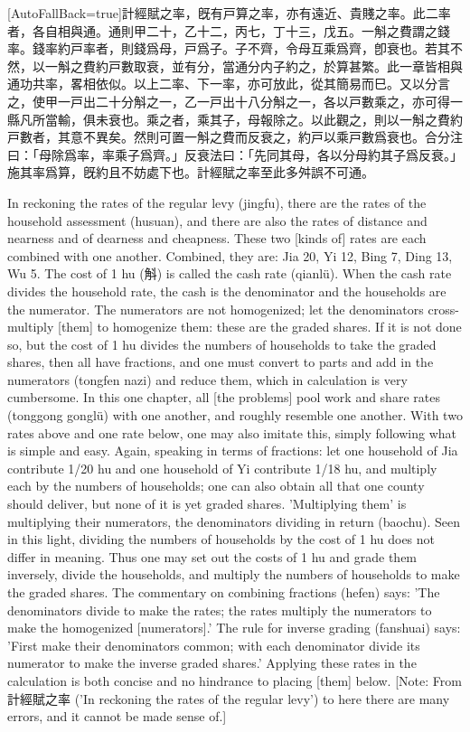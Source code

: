 \documentclass[11pt]{article}
\newcommand{\zhsmall}{\footnotesize\color{black!70}}
\newcommand{\unitlabel}[1]{\marginpar{\raggedleft\tiny\color{gray}#1}}
\newenvironment{unitzh}{\par\CJKfontspec{Noto Serif CJK SC}[AutoFallBack=true]\large\linespread{1.25}\selectfont}{\par}
\newenvironment{uniten}{\par\small\color{black!85}}{\par\medskip}
\begin{document}
\begin{unitzh}\unitlabel{jiuzhang-028.18}計經賦之率，旣有戸算之率，亦有遠近、貴賤之率。此二率者，各自相與通。通則甲二十，乙十二，丙七，丁十三，戊五。一斛之費謂之錢率。錢率約戸率者，則錢爲母，戸爲子。子不齊，令母互乘爲齊，卽衰也。若其不然，以一斛之費約戸數取衰，並有分，當通分内子約之，於算甚繁。此一章皆相與通功共率，畧相依似。以上二率、下一率，亦可放此，從其簡易而巳。又以分言之，使甲一戸出二十分斛之一，乙一戸出十八分斛之一，各以戸數乘之，亦可得一縣凡所當輸，俱未衰也。乘之者，乘其子，母報除之。以此觀之，則以一斛之費約戸數者，其意不異矣。然則可置一斛之費而反衰之，約戸以乘戸數爲衰也。合分注曰：「母除爲率，率乘子爲齊。」反衰法曰：「先同其母，各以分母約其子爲反衰。」施其率爲算，旣約且不妨處下也。{\zhsmall 計經賦之率至此多舛誤不可通。}\end{unitzh}
\begin{uniten}In reckoning the rates of the regular levy (jingfu), there are the rates of the household assessment (husuan), and there are also the rates of distance and nearness and of dearness and cheapness. These two [kinds of] rates are each combined with one another. Combined, they are: Jia 20, Yi 12, Bing 7, Ding 13, Wu 5. The cost of 1 hu (斛) is called the cash rate (qianlü). When the cash rate divides the household rate, the cash is the denominator and the households are the numerator. The numerators are not homogenized; let the denominators cross-multiply [them] to homogenize them: these are the graded shares. If it is not done so, but the cost of 1 hu divides the numbers of households to take the graded shares, then all have fractions, and one must convert to parts and add in the numerators (tongfen nazi) and reduce them, which in calculation is very cumbersome. In this one chapter, all [the problems] pool work and share rates (tonggong gonglü) with one another, and roughly resemble one another. With two rates above and one rate below, one may also imitate this, simply following what is simple and easy. Again, speaking in terms of fractions: let one household of Jia contribute 1/20 hu and one household of Yi contribute 1/18 hu, and multiply each by the numbers of households; one can also obtain all that one county should deliver, but none of it is yet graded shares. 'Multiplying them' is multiplying their numerators, the denominators dividing in return (baochu). Seen in this light, dividing the numbers of households by the cost of 1 hu does not differ in meaning. Thus one may set out the costs of 1 hu and grade them inversely, divide the households, and multiply the numbers of households to make the graded shares. The commentary on combining fractions (hefen) says: 'The denominators divide to make the rates; the rates multiply the numerators to make the homogenized [numerators].' The rule for inverse grading (fanshuai) says: 'First make their denominators common; with each denominator divide its numerator to make the inverse graded shares.' Applying these rates in the calculation is both concise and no hindrance to placing [them] below. [Note: From 計經賦之率 ('In reckoning the rates of the regular levy') to here there are many errors, and it cannot be made sense of.]\end{uniten}
\end{document}
